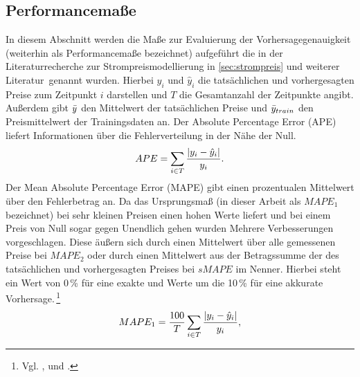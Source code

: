 


\subsection{Performancemaße}\label{sec:perfmas}
In diesem Abschnitt werden die Maße zur Evaluierung der Vorhersagegenauigkeit (weiterhin als Performancemaße bezeichnet) aufgeführt die in der Literaturrecherche zur Strompreismodellierung in \autoref{sec:strompreis} und weiterer Literatur\, genannt wurden. Hierbei $y_i$ und $\hat{y}_i$ die tatsächlichen und vorhergesagten Preise zum Zeitpunkt $i$ darstellen und $T$ die Gesamtanzahl der Zeitpunkte angibt. Außerdem gibt $\bar{y}$ den Mittelwert der tatsächlichen Preise und $\bar{y}_{train}$ den Preismittelwert der Trainingsdaten an.
%
Der Absolute Percentage Error (APE) liefert Informationen über die Fehlerverteilung in der Nähe der Null.\,
%
\begin{equation}
APE= \sum\limits_{i \in T} \frac{\abs{y_i-\hat{y}_i}}{y_i}.
\label{gl:APE}
\end{equation}
%
%
Der Mean Absolute Percentage Error (MAPE) gibt einen prozentualen Mittelwert über den Fehlerbetrag an. Da das Ursprungsmaß (in dieser Arbeit als $MAPE_1$ bezeichnet) bei sehr kleinen Preisen einen hohen Werte liefert und bei einem Preis von Null sogar gegen Unendlich gehen wurden Mehrere Verbesserungen vorgeschlagen. Diese äußern sich durch einen Mittelwert über alle gemessenen Preise bei $MAPE_2$ oder durch einen Mittelwert aus der Betragssumme der des tatsächlichen und vorhergesagten Preises bei $sMAPE$ im Nenner. Hierbei steht ein Wert von 0\,\% für eine exakte und Werte um die 10\,\% für eine akkurate Vorhersage.\,\footnote{Vgl. \citet[17]{Bobinaite2016}, \citet[2105]{Amjady2009} und \citet[894]{Lago2018}.}   
\begin{equation}
MAPE_1= \frac{100}{T} \sum\limits_{i \in T} \frac{\abs{y_i-\hat{y}_i}}{y_i},
\label{gl:MAPE_1}
\end{equation}
%

